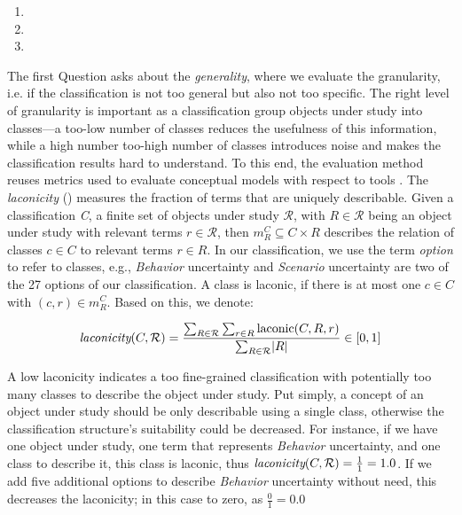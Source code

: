 \begin{enumerate}[leftmargin=\GQMquestionsIndent]
  \item[\question{1}{1}] \textGiQi 
  \item[\question{1}{2}] \textGiQii
  \item[\question{1}{3}] \textGiQiii
\end{enumerate}

\label{gqm:text:q:1:1}
The first Question  asks about the \emph{generality}, where we evaluate the granularity, i.e. if the classification is not too general but also not too specific.
The right level of granularity is important as a classification group objects under study into classes---a too-low number of classes reduces the usefulness of this information, while a high number too-high number of classes introduces noise and makes the classification results hard to understand.
To this end, the evaluation method reuses metrics used to evaluate conceptual models with respect to tools \cite{kaplan_introducing_2022,ananieva_conceptual_2020}.
The \emph{laconicity} (\label{gqm:text:m:1:1:1}) measures the fraction of terms that are uniquely describable.
Given a classification \emph{C}, a finite set of objects under study $\mathcal{R}$, with $R \in \mathcal{R}$ being an object under study with relevant terms $r \in \mathcal{R}$, then $m^C_R \subseteq C \times R$ describes the relation of classes $c \in C$ to relevant terms $r \in R$.
In our classification, we use the term \emph{option} to refer to classes, e.g., \emph{Behavior} uncertainty and \emph{Scenario} uncertainty are two of the 27 options of our classification.
A class is laconic, if there is at most one $c \in C$ with $(c,r) \in m^C_R$.
Based on this, we denote:

\begin{equation*}
  {\emph{laconicity}}(C,\mathcal{R}) = \frac{\sum\nolimits_{R\in \mathcal{R}} \sum\nolimits_{r\in R} \text{laconic}(C,R,r)}{\sum\nolimits_{R\in \mathcal{R}} \lvert R \rvert} \in [0,1]
\end{equation*}

A low laconicity indicates a too fine-grained classification with potentially too many classes to describe the object under study.
Put simply, a concept of an object under study should be only describable using a single class, otherwise the classification structure's suitability could be decreased.
For instance, if we have one object under study, one term that represents \emph{Behavior} uncertainty, and one class to describe it, this class is laconic, thus ${\emph{laconicity}}(C,\mathcal{R}) = \frac{1}{1} = 1.0$.
If we add five additional options to describe \emph{Behavior} uncertainty without need, this decreases the laconicity; in this case to zero, as $\frac{0}{1} = 0.0$

